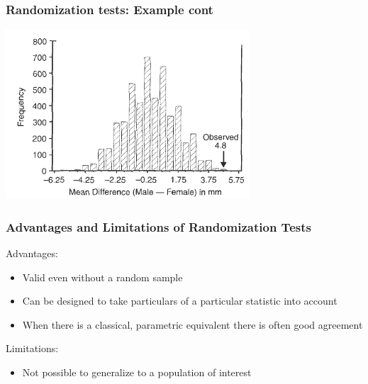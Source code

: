 \documentclass{beamer}
\begin{document}
\begin{frame}
  \frametitle{Randomization tests: Example cont}


\begin{center}
\includegraphics[height=2.5in]{jackal-distn2}
\end{center}



\end{frame}

\begin{frame}
  \frametitle{Advantages and Limitations of Randomization Tests}

Advantages:
\begin{itemize}
    \item Valid even without a random sample
    \item Can be designed to take particulars of a particular statistic into account
    \item When there is a classical, parametric equivalent there is often good agreement
\end{itemize}

Limitations:
\begin{itemize}
    \item Not possible to generalize to a population of interest
\end{itemize}

\end{frame}
\end{document}
